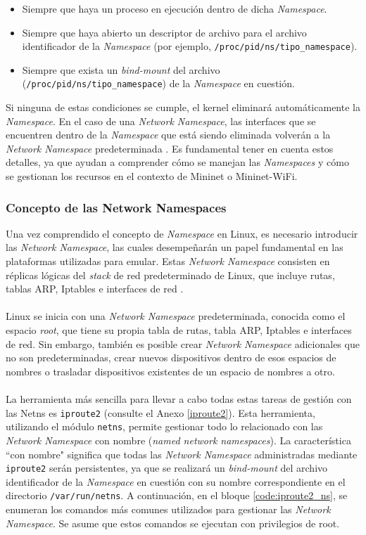 \begin{itemize}
    \item Siempre que haya un proceso en ejecución dentro de dicha \textit{Namespace}.
    \item Siempre que haya abierto un descriptor de archivo para el archivo identificador de la \textit{Namespace} (por ejemplo, \texttt{/proc/{pid}/ns/{tipo\_namespace}}).
    \item Siempre que exista un \textit{bind-mount} del archivo (\texttt{/proc/{pid}/ns/{tipo\_namespace}}) de la \textit{Namespace} en cuestión.
\end{itemize}

Si ninguna de estas condiciones se cumple, el kernel eliminará automáticamente la \textit{Namespace}. En el caso de una \textit{Network Namespace}, las interfaces que se encuentren dentro de la \textit{Namespace} que está siendo eliminada volverán a la \textit{Network Namespace} predeterminada \cite{ns}. Es fundamental tener en cuenta estos detalles, ya que ayudan a comprender cómo se manejan las \textit{Namespaces} y cómo se gestionan los recursos en el contexto de Mininet o Mininet-WiFi.

\subsubsection{Concepto de las Network Namespaces}

Una vez comprendido el concepto de \textit{Namespace} en Linux, es necesario introducir las \textit{Network Namespace}, las cuales desempeñarán un papel fundamental en las plataformas utilizadas para emular. Estas \textit{Network Namespace} consisten en réplicas lógicas del \textit{stack} de red predeterminado de Linux, que incluye rutas, tablas ARP, Iptables e interfaces de red \cite{netns}.\\
\\
Linux se inicia con una \textit{Network Namespace} predeterminada, conocida como el espacio \textit{root}, que tiene su propia tabla de rutas, tabla ARP, Iptables e interfaces de red. Sin embargo, también es posible crear \textit{Network Namespace} adicionales que no son predeterminadas, crear nuevos dispositivos dentro de esos espacios de nombres o trasladar dispositivos existentes de un espacio de nombres a otro.\\
\\
La herramienta más sencilla para llevar a cabo todas estas tareas de gestión con las Netns es \texttt{iproute2} (consulte el Anexo \ref{iproute2}). Esta herramienta, utilizando el módulo \texttt{netns}, permite gestionar todo lo relacionado con las \textit{Network Namespace} con nombre (\textit{named network namespaces}). La característica ``con nombre" significa que todas las \textit{Network Namespace} administradas mediante \texttt{iproute2} serán persistentes, ya que se realizará un \textit{bind-mount} del archivo identificador de la \textit{Namespace} en cuestión con su nombre correspondiente en el directorio \texttt{/var/run/netns}. A continuación, en el bloque \ref{code:iproute2_ns}, se enumeran los comandos más comunes utilizados para gestionar las \textit{Network Namespace}. Se asume que estos comandos se ejecutan con privilegios de root.

